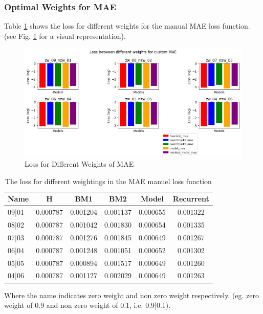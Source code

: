\subsubsection*{Optimal Weights for MAE}
Table \ref{tab:weights} shows the loss for different weights for the manual MAE loss function. (see Fig. \ref{fig:MAE-weights-init} for a visual representation). 
\begin{figure}[tbph]
	\centering
	\includegraphics[width=0.9\linewidth, height=0.5\textheight]{Figures/Results/Shuffle_Weights/weights/weights}
	\caption[Loss for Different Weights of MAE]{Loss for Different Weights of MAE}
	\label{fig:MAE-weights-init}
\end{figure}

\begin{table}[htbp]
	\centering
	\caption{The loss for different weightings in the MAE manuel loss function}
	\label{tab:weights}
	\begin{tabular}{p{2cm}ccccc}
		\toprule
		Name &  H &  BM1 &  BM2 &  Model &  Recurrent \\
		\midrule
		09|01 &       0.000787 &        0.001204 &        0.001137 &   0.000655 &            0.001322 \\
		08|02 &       0.000787 &        0.001042 &        0.001830 &   0.000654 &            0.001335 \\
		07|03 &       0.000787 &        0.001276 &        0.001845 &   0.000649 &            0.001267 \\
		06|04 &       0.000787 &        0.001248 &        0.001051 &   0.000652 &            0.001302 \\
		05|05 &       0.000787 &        0.000894 &        0.001517 &   0.000649 &            0.001260 \\
		04|06 &       0.000787 &        0.001127 &        0.002029 &   0.000649 &            0.001263 \\
		\bottomrule
	\end{tabular}
\end{table}
Where the name indicates zero weight and non zero weight respectively. (eg. zero weight of 0.9 and non zero weight of 0.1, i.e. 0.9|0.1). \\

